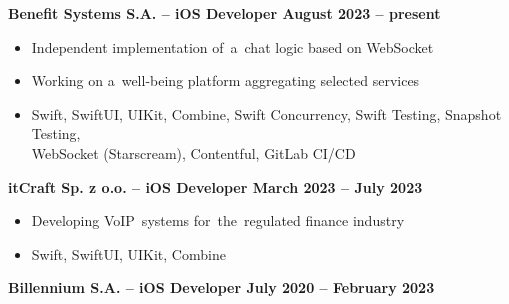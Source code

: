 \documentclass[11pt,a4paper]{article}
\newcommand*\header[1]{
    \noindent\raisebox{.1cm}{\color{MidnightBlue}\rule{1.5cm}{.05cm}\hspace{.2cm}\raisebox{-.1cm}{\large\bf #1}}}
\begin{document}
    \bigskip

    \header{Experience}

    \medskip

    {\bf Benefit Systems S.A. -- iOS Developer \hfill August 2023 -- present}

    \vspace{-.23cm}
    \begin{itemize}[leftmargin=1.5cm] \itemsep.2mm \parskip0mm 
        \item Independent implementation of~a~chat logic based on WebSocket
        \item Working on a~well-being platform aggregating selected services

        \vspace{0.1cm}
        \setlength\itemindent{-1em}
        \item[] {\small{\color{CadetBlue}{\bf Tech stack:}}
            Swift,
            SwiftUI,
            UIKit,
            Combine,
            Swift Concurrency,
            Swift Testing,
            Snapshot Testing, \\
            WebSocket (Starscream),
            Contentful,
            GitLab CI/CD
        }
    \end{itemize}

    \vspace{-.17cm}

    {\bf itCraft Sp. z o.o. -- iOS Developer \hfill March 2023 -- July 2023}

    \vspace{-.23cm}
    \begin{itemize}[leftmargin=1.5cm] \itemsep.2mm \parskip0mm 
        \item Developing VoIP~systems for~the~regulated finance industry

        \vspace{0.1cm}
        \setlength\itemindent{-1em}
        \item[] {\small{\color{CadetBlue}{\bf Tech stack:}}
            Swift,
            SwiftUI,
            UIKit,
            Combine
        }
    \end{itemize}

    \vspace{-.17cm}

    {\bf Billennium S.A. -- iOS Developer \hfill July 2020 -- February 2023}
\end{document}
